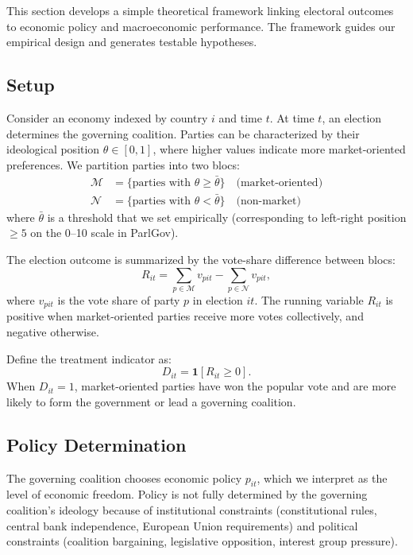 \documentclass[12pt,a4paper]{article}
\begin{document}
This section develops a simple theoretical framework linking electoral 
outcomes to economic policy and macroeconomic performance. The framework 
guides our empirical design and generates testable hypotheses.

\subsection{Setup}

Consider an economy indexed by country $i$ and time $t$. At time $t$, an 
election determines the governing coalition. Parties can be characterized 
by their ideological position $\theta \in [0, 1]$, where higher values 
indicate more market-oriented preferences. We partition parties into two 
blocs:
%
\begin{align}
    \mathcal{M} &= \{\text{parties with } \theta \geq \bar{\theta}\} 
    \quad \text{(market-oriented)} \\
    \mathcal{N} &= \{\text{parties with } \theta < \bar{\theta}\} 
    \quad \text{(non-market)}
\end{align}
%
where $\bar{\theta}$ is a threshold that we set empirically (corresponding 
to left-right position $\geq 5$ on the 0--10 scale in ParlGov).

The election outcome is summarized by the vote-share difference between blocs:
%
\begin{equation}
    R_{it} = \sum_{p \in \mathcal{M}} v_{pit} - \sum_{p \in \mathcal{N}} v_{pit},
\end{equation}
%
where $v_{pit}$ is the vote share of party $p$ in election $it$. The 
running variable $R_{it}$ is positive when market-oriented parties receive 
more votes collectively, and negative otherwise.

Define the treatment indicator as:
%
\begin{equation}
    D_{it} = \mathbf{1}[R_{it} \geq 0].
\end{equation}
%
When $D_{it} = 1$, market-oriented parties have won the popular vote and 
are more likely to form the government or lead a governing coalition.

\subsection{Policy Determination}

The governing coalition chooses economic policy $p_{it}$, which we 
interpret as the level of economic freedom. Policy is not fully 
determined by the governing coalition's ideology because of institutional 
constraints (constitutional rules, central bank independence, European 
Union requirements) and political constraints (coalition bargaining, 
legislative opposition, interest group pressure).
\end{document}
